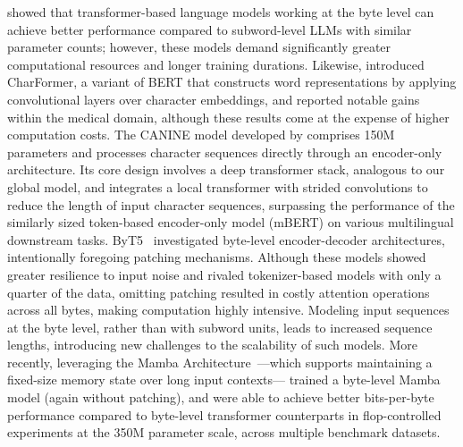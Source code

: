 \cite{Choe2019BridgingTG} showed that transformer-based language models working at the byte level can achieve better performance compared to subword-level LLMs with similar parameter counts; however, these models demand significantly greater computational resources and longer training durations. Likewise, \cite{el2020characterbert} introduced CharFormer, a variant of BERT that constructs word representations by applying convolutional layers over character embeddings, and reported notable gains within the medical domain, although these results come at the expense of higher computation costs. The CANINE model developed by \cite{clark2022canine} comprises 150M parameters and processes character sequences directly through an encoder-only architecture. Its core design involves a deep transformer stack, analogous to our global model, and integrates a local transformer with strided convolutions to reduce the length of input character sequences, surpassing the performance of the similarly sized token-based encoder-only model (mBERT) on various multilingual downstream tasks. ByT5~\citep{xue2022byt5} investigated byte-level encoder-decoder architectures, intentionally foregoing patching mechanisms. Although these models showed greater resilience to input noise and rivaled tokenizer-based models with only a quarter of the data, omitting patching resulted in costly attention operations across all bytes, making computation highly intensive. Modeling input sequences at the byte level, rather than with subword units, leads to increased sequence lengths, introducing new challenges to the scalability of such models. More recently, leveraging the Mamba Architecture~\citep{gu2023mamba}—which supports maintaining a fixed-size memory state over long input contexts—\cite{wang2024mambabyte} trained a byte-level Mamba model (again without patching), and were able to achieve better bits-per-byte performance compared to byte-level transformer counterparts in flop-controlled experiments at the 350M parameter scale, across multiple benchmark datasets.

